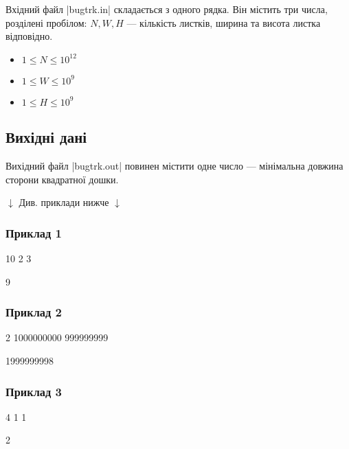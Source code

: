 \documentclass[12pt,a4paper]{article}
\begin{document}
Вхідний файл |bugtrk.in| складається з одного рядка.
Він містить три числа, розділені пробілом: \(N, W, H\) --- кількість листків, ширина та висота листка відповідно.

\begin{itemize}
    \item \(1 \leq N \leq 10^{12} \)
    \item \(1 \leq W \leq 10^{9} \)
    \item \(1 \leq H \leq 10^{9} \)
\end{itemize}


\subsection*{Вихідні дані}

Вихідний файл |bugtrk.out| повинен містити одне число --- мінімальна довжина сторони квадратної дошки.


\begin{pagebottomtext}
$\downarrow$ Див. приклади нижче $\downarrow$
\end{pagebottomtext}


\pagebreak


\subsubsection*{Приклад 1}

\textbf{}

\begin{codeblock}
10 2 3
\end{codeblock}

\textbf{}

\begin{codeblock}
9
\end{codeblock}


\subsubsection*{Приклад 2}

\textbf{}

\begin{codeblock}
2 1000000000 999999999
\end{codeblock}

\textbf{}

\begin{codeblock}
1999999998
\end{codeblock}


\subsubsection*{Приклад 3}

\textbf{}

\begin{codeblock}
4 1 1
\end{codeblock}

\textbf{}

\begin{codeblock}
2
\end{codeblock}
\end{document}
